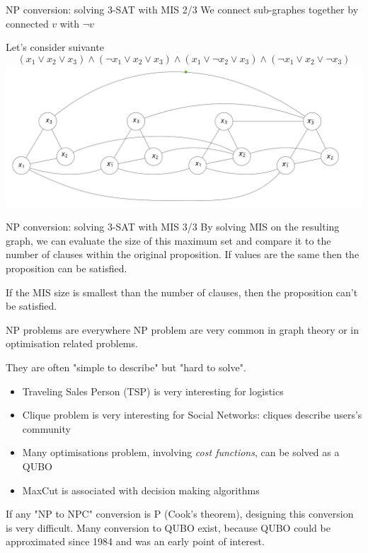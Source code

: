 \begin{frame}{NP conversion: solving 3-SAT with MIS 2/3}
We connect sub-graphes together by connected $v$ with $\lnot v$

Let's consider
suivante
\begin{equation*}
    (x_1 \lor x_2 \lor x_3) 
    \land (\lnot x_1 \lor x_2 \lor x_3 ) 
    \land (x_1 \lor \lnot x_2 \lor x_3 )
    \land (\lnot x_1 \lor x_2 \lor \lnot x_3 )
\end{equation*}
\centering
\includegraphics[scale=0.25]{images/Graphe-Clause3SAT.png}
\end{frame}

\begin{frame}{NP conversion: solving 3-SAT with MIS 3/3}
By solving MIS on the resulting graph, we can evaluate the size of this maximum set and compare it to the number of clauses
within the original proposition. If values are the same then the proposition can be satisfied. 


If the MIS size is smallest than the number of clauses, then the proposition can't be satisfied.
\end{frame}

\begin{frame}{NP problems are everywhere}
NP problem are very common in graph theory or in optimisation related problems.

They are often "simple to describe" but "hard to solve".
\begin{itemize}
    \item Traveling Sales Person (TSP) is very interesting for logistics 
    \item Clique problem is very interesting for Social Networks: cliques describe users's community
    \item Many optimisations problem, involving \textit{cost functions}, can be solved as a QUBO
    \item MaxCut is associated with decision making algorithms
\end{itemize}

If any "NP to NPC" conversion is P (Cook's theorem), designing this conversion is very difficult. Many conversion to 
QUBO exist, because QUBO could be approximated since 1984 and was an early point of interest. 
\end{frame}
